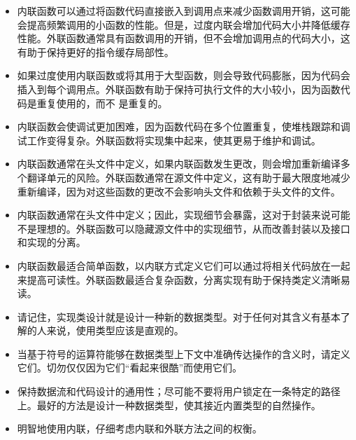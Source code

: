\begin{itemize}
\item
内联函数可以通过将函数代码直接嵌入到调用点来减少函数调用开销，这可能会提高频繁调用的小函数的性能。但是，过度内联会增加代码大小并降低缓存性能。外联函数通常具有函数调用的开销，但不会增加调用点的代码大小，这有助于保持更好的指令缓存局部性。

\item
如果过度使用内联函数或将其用于大型函数，则会导致代码膨胀，因为代码会插入到每个调用点。外联函数有助于保持可执行文件的大小较小，因为函数代码是重复使用的，而不 是重复的。

\item
内联函数会使调试更加困难，因为函数代码在多个位置重复，使堆栈跟踪和调试工作变得复杂。外联函数将实现集中起来，使其更易于维护和调试。

\item
内联函数通常在头文件中定义，如果内联函数发生更改，则会增加重新编译多个翻译单元的风险。外联函数通常在源文件中定义，这有助于最大限度地减少重新编译，因为对这些函数的更改不会影响头文件和依赖于头文件的文件。

\item
内联函数通常在头文件中定义；因此，实现细节会暴露，这对于封装来说可能不是理想的。外联函数可以隐藏源文件中的实现细节，从而改善封装以及接口和实现的分离。

\item
内联函数最适合简单函数，以内联方式定义它们可以通过将相关代码放在一起来提高可读性。外联函数最适合复杂函数，分离实现有助于保持类定义清晰易读。
\end{itemize}


\begin{itemize}
\item
请记住，实现类设计就是设计一种新的数据类型。对于任何对其含义有基本了解的人来说，使用类型应该是直观的。

\item
当基于符号的运算符能够在数据类型上下文中准确传达操作的含义时，请定义它们。切勿仅仅因为它们“看起来很酷”而使用它们。

\item
保持数据流和代码设计的通用性；尽可能不要将用户锁定在一条特定的路径上。最好的方法是设计一种数据类型，使其接近内置类型的自然操作。

\item
明智地使用内联，仔细考虑内联和外联方法之间的权衡。
\end{itemize}
